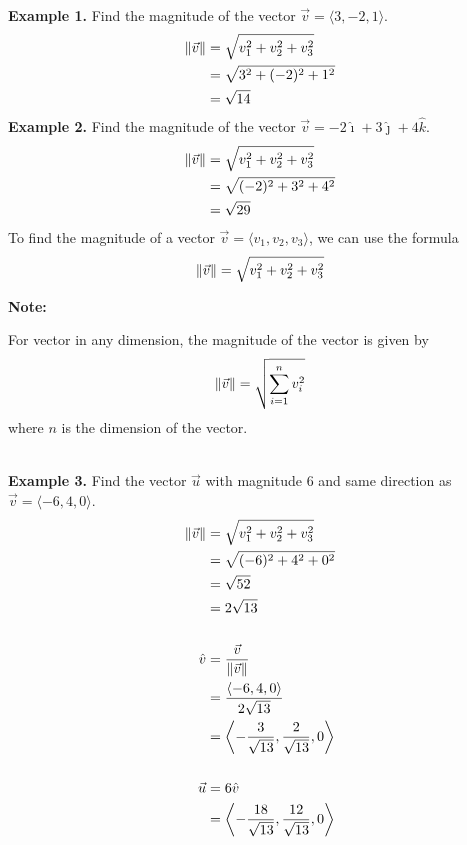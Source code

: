 ~\\
\noindent\textbf{Example 1. } Find the magnitude of the vector $\vec{v} = \langle 3, -2, 1 \rangle$.
\begin{align*}
    \left\lVert\vec{v}\right\rVert & = \sqrt{v_1^2 + v_2^2 + v_3^2} \\
                   & = \sqrt{3^2 + (-2)^2 + 1^2}    \\
                   & = \sqrt{14}
\end{align*}
\noindent\textbf{Example 2. } Find the magnitude of the vector $\vec{v} = -2\hat{\imath} + 3\hat{\jmath} + 4\hat{k}$.
\begin{align*}
    \left\lVert\vec{v}\right\rVert & = \sqrt{v_1^2 + v_2^2 + v_3^2} \\
                   & = \sqrt{(-2)^2 + 3^2 + 4^2}    \\
                   & = \sqrt{29}
\end{align*}
To find the magnitude of a vector $\vec{v} = \langle v_1, v_2, v_3 \rangle$, we can use the formula \[\left\lVert\vec{v}\right\rVert = \sqrt{v_1^2 + v_2^2 + v_3^2}\]
\begin{framed}
    \noindent\textbf{Note: }

    \noindent For vector in any dimension, the magnitude of the vector is given by \[\left\lVert\vec{v}\right\rVert = \sqrt{\sum_{i=1}^{n} v_i^2}\] where $n$ is the dimension of the vector.
\end{framed}
~\\
\noindent\textbf{Example 3. } Find the vector $\vec{u}$ with magnitude 6 and same direction as $\vec{v} = \langle -6, 4, 0 \rangle$.
\begin{align*}
    \left\lVert\vec{v}\right\rVert & = \sqrt{v_1^2 + v_2^2 + v_3^2}                                              \\
                   & = \sqrt{(-6)^2 + 4^2 + 0^2}                                                 \\
                   & = \sqrt{52}                                                                 \\
                   & = 2\sqrt{13}                                                                \\\\
    \hat{v}        & = \frac{\vec{v}}{\left\lVert\vec{v}\right\rVert}                                            \\
                   & = \frac{\langle -6, 4, 0 \rangle}{2\sqrt{13}}                               \\
                   & = \left\langle -\frac{3}{\sqrt{13}}, \frac{2}{\sqrt{13}}, 0 \right\rangle   \\\\
    \vec{u}        & = 6\hat{v}                                                                  \\
                   & = \left\langle -\frac{18}{\sqrt{13}}, \frac{12}{\sqrt{13}}, 0 \right\rangle
\end{align*}